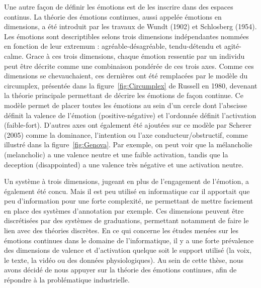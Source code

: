 
Une autre façon de définir les émotions est de les inscrire dans des espaces continus. La théorie des émotions continues, aussi appelée émotions en dimensions, a été introduit par les travaux de Wundt (1902) et Schlosberg (1954). Les émotions sont descriptibles selons trois dimensions indépendantes nommées en fonction de leur extremum : agréable-désagréable, tendu-détendu et agité-calme. Grace à ces trois dimensions, chaque émotion ressentie par un individu peut être décrite comme une combinaison pondérée de ces trois axes. Comme ces dimensions se chevauchaient, ces dernières ont été remplacées par le modèle du circumplex, présentée dans la figure~\ref{fig:Circumplex} de Russell en 1980, devenant la théorie principale permettant de décrire les émotions de façon continue. Ce modèle permet de placer toutes les émotions au sein d'un cercle dont l'abscisse définit la valence de l'émotion (positive-négative) et l'ordonnée définit l'activation (faible-fort). D'autres axes ont également été ajoutées sur ce modèle par Scherer (2005) comme la dominance, l'intention ou l'axe conducteur/obstructif, comme illustré dans la figure~\ref{fig:Genova}. Par exemple, on peut voir que la mélancholie (melancholic) a une valence neutre et une faible activation, tandis que la deception (disappointed) a une valence très négative et une activation neutre.

Un système à trois dimensions, jugeant en plus de l'engagement de l'émotion, a également été concu. Mais il est peu utilisé en informatique car il apportait que peu d'information pour une forte complexité, ne permettant de mettre faciement en place des systèmes d'annotation par exemple.
Ces dimensions peuvent être discrétisées par des systèmes de graduations, permettant notamment de faire le lien avec des théories discrètes.
En ce qui concerne les études menées sur les émotions continues dans le domaine de l'informatique, il y a une forte prévalence des dimensions de valence et d'activation quelque soit le support utilisé (la voix, le texte, la vidéo ou des données physiologiques).
Au sein de cette thèse, nous avons décidé de nous appuyer sur la théorie des émotions continues, afin de répondre à la problématique industrielle.



